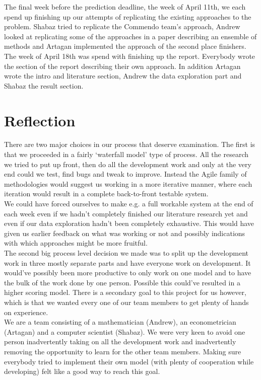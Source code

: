 \documentclass{llncs}
\begin{document}
The final week before the prediction deadline, the week of April 11th, we each spend up finishing up our attempts of replicating the existing approaches to the problem. Shabaz tried to replicate the Commendo team's approach\cite{Jahrer2013}, Andrew looked at replicating some of the approaches in a paper describing an ensemble of methods\cite{Liu2013} and Artagan implemented the approach of the second place finishers\cite{Wang2013}.\\
The week of April 18th was spend with finishing up the report. Everybody wrote the section of the report describing their own approach. In addition Artagan wrote the intro and literature section, Andrew the data exploration part and Shabaz the result section.
\section{Reflection}
There are two major choices in our process that deserve examination. The first is that we proceeded in a fairly `waterfall model' type of process. All the research we tried to put up front, then do all the development work and only at the very end could we test, find bugs and tweak to improve. Instead the Agile family of methodologies would suggest us working in a more iterative manner, where each iteration would result in a complete back-to-front testable system.\\
We could have forced ourselves to make e.g. a full workable system at the end of each week even if we hadn't completely finished our literature research yet and even if our data exploration hadn't been completely exhaustive. This would have given us earlier feedback on what was working or not and possibly indications with which approaches might be more fruitful.\\
The second big process level decision we made was to split up the development work in three mostly separate parts and have everyone work on development. It would've possibly been more productive to only work on one model and to have the bulk of the work done by one person. Possible this could've resulted in a higher scoring model. There is a secondary goal to this project for us however, which is that we wanted every one of our team members to get plenty of hands on experience.\\
We are a team consisting of a mathematician (Andrew), an econometrician (Artagan) and a computer scientist (Shabaz). We were very keen to avoid one person inadvertently taking on all the development work and inadvertently removing the opportunity to learn for the other team members. Making sure everybody tried to implement their own model (with plenty of cooperation while developing) felt like a good way to reach this goal.


\end{document}

